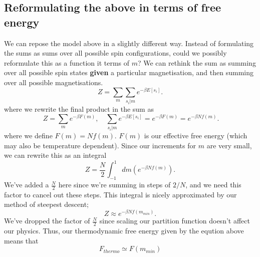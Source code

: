 \documentclass[11pt, oneside]{article}   	%
\begin{document}
\subsection{Reformulating the above in terms of free energy}
We can repose the model above in a slightly different way. Instead of formulating the sums as sums over all possible spin configurations, could we possibly reformulate this as a function it terms of $m$? We can rethink the sum as summing over all possible spin states \textbf{given} a particular  magnetisation, and then summing over all possible magnetisations. 
\[ 
	Z = \sum_m \sum_{s_i | m} e^{- \beta E[s_i]}. 
\] 
where we rewrite the final product in the sum as 
\[  
\	 Z = \sum_m e^{ - \beta F(m)}, \quad \sum_{s_i | m}e^{ - \beta E[s_i]} = e^{ - \beta F(m)} = e^{ - \beta N f(m)}. 
\] 
where we define $F(m) = N f(m)$. $F(m)$ is our effective free energy (which may also be temperature dependent). Since our increments for $m$ are very small, we can rewrite this as an integral 
\[ 
	Z = \frac{N}{ 2}  \int_{-1}^{1} dm \left(  e^{ - \beta N f(m)} \right) . 
\] 
We've added a $\frac{ N}{ 2} $ here since we're summing in steps of $2 / N$, and we need this factor to cancel out these steps. 
This integral is nicely approximated by our method of steepest descent; 
\[ 
	Z \approx e^{- \beta N f(m_{min})}. 
\]
We've dropped the factor of $\frac{N}{ 2} $ since scaling our partition function doesn't affect our physics. Thus, our thermodynamic free energy given by the eqution above means that \[ 
	F_{thermo} \simeq F(m_{min}) 
\] 
 
\end{document}
